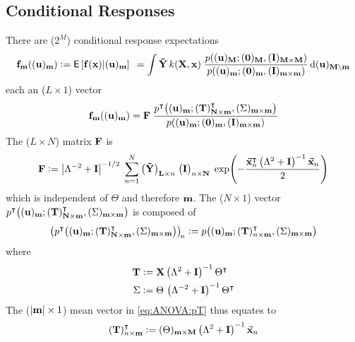 \documentclass[a4paper, margin=1in, reqno]{RAMArticle}
\begin{document}
	\subsection{Conditional Responses}
		There are (\(2^{M}\)) conditional response expectations
		\begin{equation*}
			\mathbf{f}_{\mathbf{m}}((\mathbf{u})_{\mathbf{m}}) 
				\mathrel{\mathop:}= \mathsf{E}\left[\mathbf{f}(\mathbf{x}) \vert (\mathbf{u})_{\mathbf{m}} \right] 
			\phantom{:}= \int 
			\mathbf{\tilde{Y}} \, k(\mathbf{X}, \mathbf{x}) \; 
				\frac
					{p\!\left((\mathbf{u})_{\mathbf{M}} ; (\mathbf{0})_{\mathbf{M}},(\mathbf{I})_{\mathbf{M}\times\mathbf{M}}\right)} 
					{p\!\left((\mathbf{u})_{\mathbf{m}} ; (\mathbf{0})_{\mathbf{m}},(\mathbf{I})_{\mathbf{m}\times\mathbf{m}}\right)} 
			\, \mathrm{d} (\mathbf{u})_{\mathbf{M}\setminus\mathbf{m}}	
		\end{equation*}
		each an (\(L\times 1\)) vector
		\begin{equation*}
			\mathbf{f}_{\mathbf{m}}((\mathbf{u})_{\mathbf{m}}) = \mathbf{F} \; 
				\frac 
					{p^{\intercal}\!\left((\mathbf{u})_{\mathbf{m}} ; (\mathbf{T})_{\mathbf{N}\times\mathbf{m}}^{\intercal}, (\Sigma)_{\mathbf{m}\times\mathbf{m}}\right)}
					{p\!\left((\mathbf{u})_{\mathbf{m}} ; (\mathbf{0})_{\mathbf{m}},(\mathbf{I})_{\mathbf{m}\times\mathbf{m}}\right)}
		\end{equation*}
		The (\(L\times N\)) matrix \(\mathbf{F}\) is
		\begin{equation*}
			\mathbf{F} \mathrel{\mathop:}= \left\lvert\Lambda^{-2}+\mathbf{I}\right\rvert^{-1/2} \; \sum_{n=1}^{N} \big(\mathbf{\tilde{Y}}\big)_{\mathbf{L} \times n} 
				\; \big(\mathbf{I}\big)_{n \times \mathbf{N}} \; \exp\!\left(-\frac{\vec{\mathbf{x}}_{n}^{\intercal}
				\left(\Lambda^{2} + \mathbf{I}\right)^{-1}\vec{\mathbf{x}}_{n}}{2}\right)
		\end{equation*}
		which is independent of \(\Theta\) and therefore \(\mathbf{m}\).
		The (\(N\times 1\)) vector 
		\(p^{\intercal}\!\left((\mathbf{u})_{\mathbf{m}} ; (\mathbf{T})_{\mathbf{N}\times\mathbf{m}}^{\intercal}, (\Sigma)_{\mathbf{m}\times\mathbf{m}}\right)\) 
		is composed of
		\begin{equation}\label{eq:ANOVA:pT}
			\left(p^{\intercal}\!\left((\mathbf{u})_{\mathbf{m}} ; (\mathbf{T})_{\mathbf{N}\times\mathbf{m}}^{\intercal}, (\Sigma)_{\mathbf{m}\times\mathbf{m}}\right)\right)_{\!n}
			\mathrel{\mathop:}=
			p\!\left((\mathbf{u})_{\mathbf{m}} ; (\mathbf{T})_{n\times\mathbf{m}}^{\intercal}, (\Sigma)_{\mathbf{m}\times\mathbf{m}}\right)
		\end{equation}
		where
		\begin{align*}
			\mathbf{T} &\mathrel{\mathop:}= 
				\mathbf{X} \left(\Lambda^{2} + \mathbf{I}\right)^{-1} \Theta^{\intercal} \\
			\Sigma &\mathrel{\mathop:}= 
				\Theta \, \left(\Lambda^{-2} + \mathbf{I}\right)^{-1} \Theta^{\intercal}
		\end{align*}
		The (\(\left\lvert\mathbf{m}\right\rvert\times 1\)) mean vector in \cref{eq:ANOVA:pT} thus equates to
		\begin{equation*}
			(\mathbf{T})_{n\times\mathbf{m}}^{\intercal} \mathrel{\mathop:}=
			(\Theta)_{\mathbf{m}\times\mathbf{M}} \left(\Lambda^{2} + \mathbf{I}\right)^{-1} \vec{\mathbf{x}}_{n}
		\end{equation*}
\end{document}
